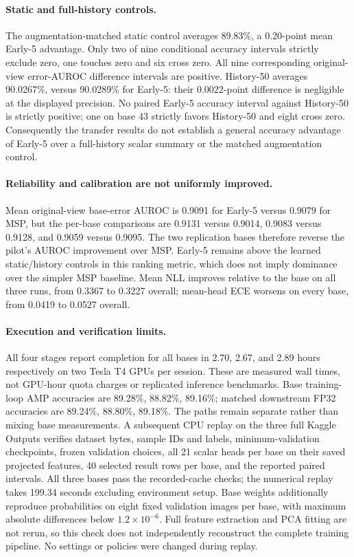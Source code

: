 \paragraph{Static and full-history controls.}
The augmentation-matched static control averages 89.83\%, a 0.20-point mean Early-5 advantage. Only two of nine conditional accuracy intervals strictly exclude zero, one touches zero and six cross zero. All nine corresponding original-view error-AUROC difference intervals are positive. History-50 averages 90.0267\%, versus 90.0289\% for Early-5: their 0.0022-point difference is negligible at the displayed precision. No paired Early-5 accuracy interval against History-50 is strictly positive; one on base 43 strictly favors History-50 and eight cross zero. Consequently the transfer results do not establish a general accuracy advantage of Early-5 over a full-history scalar summary or the matched augmentation control.

\paragraph{Reliability and calibration are not uniformly improved.}
Mean original-view base-error AUROC is 0.9091 for Early-5 versus 0.9079 for MSP, but the per-base comparisons are 0.9131 versus 0.9014, 0.9083 versus 0.9128, and 0.9059 versus 0.9095. The two replication bases therefore reverse the pilot's AUROC improvement over MSP. Early-5 remains above the learned static/history controls in this ranking metric, which does not imply dominance over the simpler MSP baseline. Mean NLL improves relative to the base on all three runs, from 0.3367 to 0.3227 overall; mean-head ECE worsens on every base, from 0.0419 to 0.0527 overall.

\paragraph{Execution and verification limits.}
All four stages report completion for all bases in 2.70, 2.67, and 2.89 hours respectively on two Tesla T4 GPUs per session. These are measured wall times, not GPU-hour quota charges or replicated inference benchmarks. Base training-loop AMP accuracies are 89.28\%, 88.82\%, 89.16\%; matched downstream FP32 accuracies are 89.24\%, 88.80\%, 89.18\%. The paths remain separate rather than mixing base measurements. A subsequent CPU replay on the three full Kaggle Outputs verifies dataset bytes, sample IDs and labels, minimum-validation checkpoints, frozen validation choices, all 21 scalar heads per base on their saved projected features, 40 selected result rows per base, and the reported paired intervals. All three bases pass the recorded-cache checks; the numerical replay takes 199.34 seconds excluding environment setup. Base weights additionally reproduce probabilities on eight fixed validation images per base, with maximum absolute differences below $1.2\times10^{-6}$. Full feature extraction and PCA fitting are not rerun, so this check does not independently reconstruct the complete training pipeline. No settings or policies were changed during replay.

